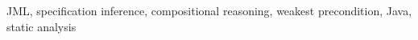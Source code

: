 \documentclass[10pt,conference]{IEEEtran}
\begin{document}
\begin{IEEEkeywords}
JML, specification inference, compositional reasoning, weakest
precondition, Java, static analysis
\end{IEEEkeywords}












\newpage


\end{document}
